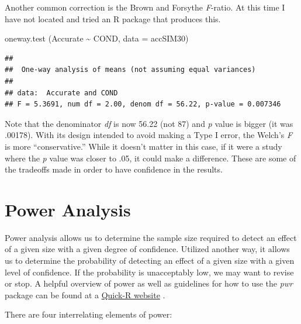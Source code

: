 \documentclass[
  english,
]{book}
\newenvironment{Shaded}{\begin{snugshade}}{\end{snugshade}}
\newcommand{\AttributeTok}[1]{\textcolor[rgb]{0.77,0.63,0.00}{#1}}
\newcommand{\FunctionTok}[1]{\textcolor[rgb]{0.00,0.00,0.00}{#1}}
\newcommand{\NormalTok}[1]{#1}
\newcommand{\SpecialCharTok}[1]{\textcolor[rgb]{0.00,0.00,0.00}{#1}}
\begin{document}
Another common correction is the Brown and Forsythe \emph{F}-ratio. At this time I have not located and tried an R package that produces this.

\begin{Shaded}
\begin{Highlighting}[]
\FunctionTok{oneway.test}\NormalTok{ (Accurate }\SpecialCharTok{\textasciitilde{}}\NormalTok{ COND, }\AttributeTok{data =}\NormalTok{ accSIM30)}
\end{Highlighting}
\end{Shaded}

\begin{verbatim}
## 
##  One-way analysis of means (not assuming equal variances)
## 
## data:  Accurate and COND
## F = 5.3691, num df = 2.00, denom df = 56.22, p-value = 0.007346
\end{verbatim}

Note that the denominator \emph{df} is now 56.22 (not 87) and \emph{p} value is bigger (it was .00178). With its design intended to avoid making a Type I error, the Welch's \emph{F} is more ``conservative.'' While it doesn't matter in this case, if it were a study where the \emph{p} value was closer to .05, it could make a difference. These are some of the tradeoffs made in order to have confidence in the results.

\hypertarget{power-analysis}{%
\section{Power Analysis}\label{power-analysis}}

Power analysis allows us to determine the sample size required to detect an effect of a given size with a given degree of confidence. Utilized another way, it allows us to determine the probability of detecting an effect of a given size with a given level of confidence. If the probability is unacceptably low, we may want to revise or stop. A helpful overview of power as well as guidelines for how to use the \emph{pwr} package can be found at a \href{https://www.statmethods.net/stats/power.html}{Quick-R website} \citep{kabacoff_power_2017}.

There are four interrelating elements of power:
\end{document}
